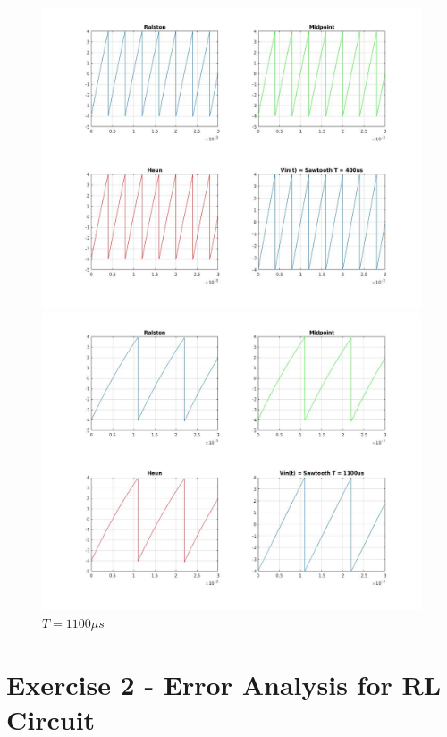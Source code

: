 \documentclass[11pt,a4paper]{article}
\begin{document}
\begin{figure}[h]
	\vspace{-5mm}
	\centering
	\includegraphics[width=\textwidth]{Ex1_Figs/saw400.jpg}
	\vspace{-15mm}
	\caption{$T = 400 \mu s$}
	\label{fig:RL4}
	\includegraphics[width=\textwidth]{Ex1_Figs/saw1100.jpg}
	\vspace{-15mm}
	\caption{$T = 1100 \mu s$}
	\label{fig:RL4}
\end{figure}

\pagebreak

\section{Exercise 2 - Error Analysis for RL Circuit}\vspace{-1mm}
\end{document}
